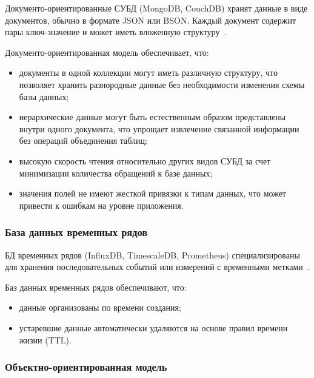 \noindent
\hspace{1.25cm}
Документо-ориентированные СУБД (MongoDB, CouchDB) хранят данные в виде документов, обычно в формате JSON или BSON. Каждый документ содержит пары ключ-значение и может иметь вложенную структуру~\cite{luchinina}.

\noindent
\hspace{1.25cm}
Документо-ориентированная модель обеспечивает, что:

\begin{itemize}
    \item документы в одной коллекции могут иметь различную структуру, что позволяет хранить разнородные данные без необходимости изменения схемы базы данных;
    
    \item иерархические данные могут быть естественным образом представлены внутри одного документа, что упрощает извлечение связанной информации без операций объединения таблиц;
    
    \item высокую скорость чтения относительно других видов СУБД за счет минимизации количества обращений к базе данных;
    
    \item значения полей не имеют жесткой привязки к типам данных, что может привести к ошибкам на уровне приложения.
\end{itemize}

\subsubsection{База данных временных рядов}

\noindent
\hspace{1.25cm}
БД временных рядов (InfluxDB, TimescaleDB, Prometheus) специализированы для хранения последовательных событий или измерений с временными метками~\cite{komarov}.

\noindent
\hspace{1.25cm}
Баз данных временных рядов обеспечивают, что:

\begin{itemize}
    \item данные организованы по времени создания;
    
    \item устаревшие данные автоматически удаляются на основе правил времени жизни (TTL).
\end{itemize}

\subsubsection{Объектно-ориентированная модель}

